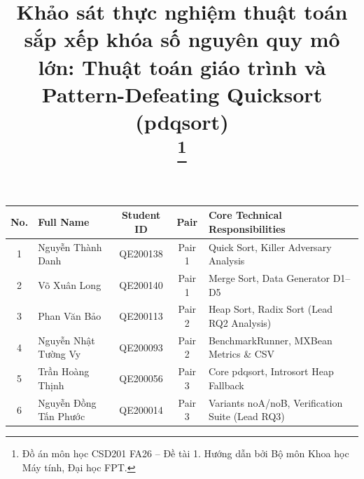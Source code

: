 \documentclass[conference]{IEEEtran}
\begin{document}
\begin{center}
\large
\begin{tabular}{|c|l|c|c|l|}
\hline
\textbf{No.} & \textbf{Full Name} & \textbf{Student ID} & \textbf{Pair} & \textbf{Core Technical Responsibilities} \\ \hline
1 & Nguyễn Thành Danh & QE200138 & Pair 1 & Quick Sort, Killer Adversary Analysis \\ \hline
2 & Võ Xuân Long & QE200140 & Pair 1 & Merge Sort, Data Generator D1--D5 \\ \hline
3 & Phan Văn Bảo & QE200113 & Pair 2 & Heap Sort, Radix Sort (Lead RQ2 Analysis) \\ \hline
4 & Nguyễn Nhật Tường Vy & QE200093 & Pair 2 & BenchmarkRunner, MXBean Metrics \& CSV \\ \hline
5 & Trần Hoàng Thịnh & QE200056 & Pair 3 & Core pdqsort, Introsort Heap Fallback \\ \hline
6 & Nguyễn Đồng Tấn Phước & QE200014 & Pair 3 & Variants noA/noB, Verification Suite (Lead RQ3) \\ \hline
\end{tabular}

\end{center}
\clearpage
\twocolumn


\title{\LARGE\bfseries Khảo sát thực nghiệm thuật toán sắp xếp khóa số nguyên quy mô lớn: Thuật toán giáo trình và Pattern-Defeating Quicksort (pdqsort)\\
\thanks{Đồ án môn học CSD201 FA26 -- Đề tài 1. Hướng dẫn bởi Bộ môn Khoa học Máy tính, Đại học FPT.}
}

\author{
}

\maketitle
\end{document}
